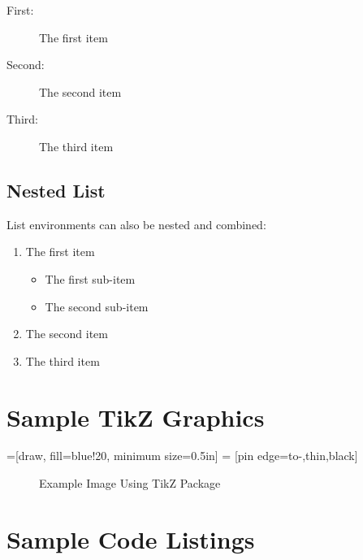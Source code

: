 \documentclass[]{nasa-latex-docs}
\begin{document}
\begin{description}
  \item[First:] The first item
  \item[Second:] The second item
  \item[Third:] The third item
\end{description}

\subsection{Nested List}

List environments can also be nested and combined:

\begin{enumerate}
   \item The first item
      \begin{itemize}[topsep=0pt]
         \item The first sub-item
         \item The second sub-item
      \end{itemize}
   \item The second item
   \item The third item
\end{enumerate}

\section{Sample TikZ Graphics}

\usetikzlibrary{arrows}
=[draw, fill=blue!20, minimum size=0.5in]
 = [pin edge={to-,thin,black}]

\begin{figure}[H]
      \caption{Example Image Using TikZ Package}
      \label{fig:block_diagram}
\end{figure}

\section{Sample Code Listings}


\end{document}
